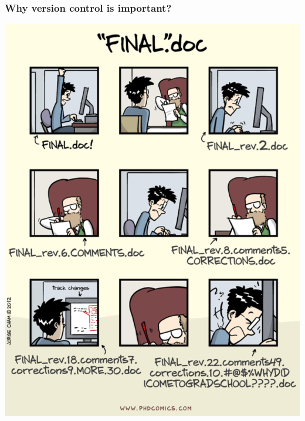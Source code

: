 \documentclass[svgnames]{beamer}
\begin{document}
\begin{frame}
    \frametitle{Why version control is important?}
    \begin{center}
        \includegraphics[scale=0.29]{img/phd_comics.png}
    \end{center}
\end{frame}
\end{document}
